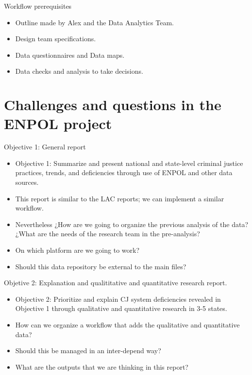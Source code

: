 \documentclass[
  ignorenonframetext,
]{beamer}
\begin{document}
\begin{frame}{Workflow prerequisites}
\protect\hypertarget{workflow-prerequisites}{}
\begin{itemize}
\item
  Outline made by Alex and the Data Analytics Team.
\item
  Design team specifications.
\item
  Data questionnaires and Data maps.
\item
  Data checks and analysis to take decisions.
\end{itemize}
\end{frame}

\hypertarget{challenges-and-questions-in-the-enpol-project}{%
\section{Challenges and questions in the ENPOL
project}\label{challenges-and-questions-in-the-enpol-project}}

\begin{frame}{Objective 1: General report}
\protect\hypertarget{objective-1-general-report}{}
\begin{itemize}
\item
  Objective 1: Summarize and present national and state-level criminal
  justice practices, trends, and deficiencies through use of ENPOL and
  other data sources.
\item
  This report is similar to the LAC reports; we can implement a similar
  workflow.
\item
  Nevertheless ¿How are we going to organize the previous analysis of
  the data? ¿What are the needs of the research team in the
  pre-analysis?
\item
  On which platform are we going to work?
\item
  Should this data repository be external to the main files?
\end{itemize}
\end{frame}

\begin{frame}{Objetive 2: Explanation and qualititative and quantitative
research report.}
\protect\hypertarget{objetive-2-explanation-and-qualititative-and-quantitative-research-report.}{}
\begin{itemize}
\item
  Objective 2: Prioritize and explain CJ system deficiencies revealed in
  Objective 1 through qualitative and quantitative research in 3-5
  states.
\item
  How can we organize a workflow that adds the qualitative and
  quantitative data?
\item
  Should this be managed in an inter-depend way?
\item
  What are the outputs that we are thinking in this report?
\end{itemize}
\end{frame}
\end{document}
